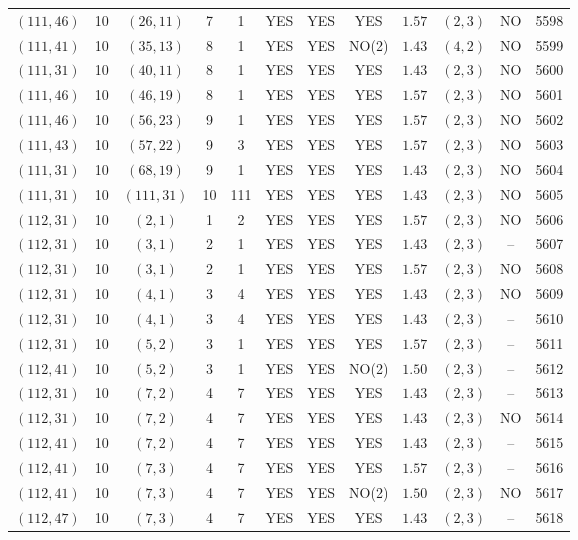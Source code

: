 \begin{longtable}{|c|c|c|c|c|c|c|c|c|c|c|c|}
$(111,46)$ & 10 & $(26,11)$ & 7 & 1 & YES & YES & YES & $1.57$ & $(2,3)$ & NO & 5598\\
$(111,41)$ & 10 & $(35,13)$ & 8 & 1 & YES & YES & NO(2) & $1.43$ & $(4,2)$ & NO & 5599\\
$(111,31)$ & 10 & $(40,11)$ & 8 & 1 & YES & YES & YES & $1.43$ & $(2,3)$ & NO & 5600\\
$(111,46)$ & 10 & $(46,19)$ & 8 & 1 & YES & YES & YES & $1.57$ & $(2,3)$ & NO & 5601\\
$(111,46)$ & 10 & $(56,23)$ & 9 & 1 & YES & YES & YES & $1.57$ & $(2,3)$ & NO & 5602\\
$(111,43)$ & 10 & $(57,22)$ & 9 & 3 & YES & YES & YES & $1.57$ & $(2,3)$ & NO & 5603\\
$(111,31)$ & 10 & $(68,19)$ & 9 & 1 & YES & YES & YES & $1.43$ & $(2,3)$ & NO & 5604\\
$(111,31)$ & 10 & $(111,31)$ & 10 & 111 & YES & YES & YES & $1.43$ & $(2,3)$ & NO & 5605\\
$(112,31)$ & 10 & $(2,1)$ & 1 & 2 & YES & YES & YES & $1.57$ & $(2,3)$ & NO & 5606\\
$(112,31)$ & 10 & $(3,1)$ & 2 & 1 & YES & YES & YES & $1.43$ & $(2,3)$ & -- & 5607\\
$(112,31)$ & 10 & $(3,1)$ & 2 & 1 & YES & YES & YES & $1.57$ & $(2,3)$ & NO & 5608\\
$(112,31)$ & 10 & $(4,1)$ & 3 & 4 & YES & YES & YES & $1.43$ & $(2,3)$ & NO & 5609\\
$(112,31)$ & 10 & $(4,1)$ & 3 & 4 & YES & YES & YES & $1.43$ & $(2,3)$ & -- & 5610\\
$(112,31)$ & 10 & $(5,2)$ & 3 & 1 & YES & YES & YES & $1.57$ & $(2,3)$ & -- & 5611\\
$(112,41)$ & 10 & $(5,2)$ & 3 & 1 & YES & YES & NO(2) & $1.50$ & $(2,3)$ & -- & 5612\\
$(112,31)$ & 10 & $(7,2)$ & 4 & 7 & YES & YES & YES & $1.43$ & $(2,3)$ & -- & 5613\\
$(112,31)$ & 10 & $(7,2)$ & 4 & 7 & YES & YES & YES & $1.43$ & $(2,3)$ & NO & 5614\\
$(112,41)$ & 10 & $(7,2)$ & 4 & 7 & YES & YES & YES & $1.43$ & $(2,3)$ & -- & 5615\\
$(112,41)$ & 10 & $(7,3)$ & 4 & 7 & YES & YES & YES & $1.57$ & $(2,3)$ & -- & 5616\\
$(112,41)$ & 10 & $(7,3)$ & 4 & 7 & YES & YES & NO(2) & $1.50$ & $(2,3)$ & NO & 5617\\
$(112,47)$ & 10 & $(7,3)$ & 4 & 7 & YES & YES & YES & $1.43$ & $(2,3)$ & -- & 5618\\

\end{longtable}
